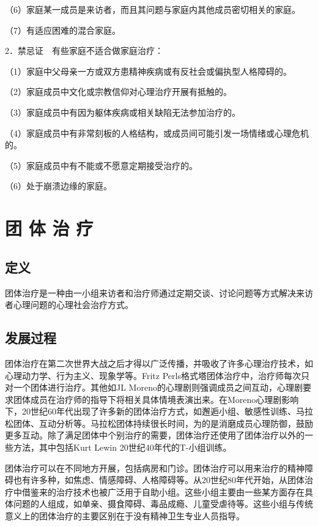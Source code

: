 （6）家庭某一成员是来访者，而且其问题与家庭内其他成员密切相关的家庭。

（7）有适应困难的混合家庭。

2．禁忌证　有些家庭不适合做家庭治疗：

（1）家庭中父母亲一方或双方患精神疾病或有反社会或偏执型人格障碍的。

（2）家庭成员中文化或宗教信仰对心理治疗开展有抵触的。

（3）家庭成员中有因为躯体疾病或相关缺陷无法参加治疗的。

（4）家庭成员中有非常刻板的人格结构，或成员间可能引发一场情绪或心理危机的。

（5）家庭成员中有不能或不愿意定期接受治疗的。

（6）处于崩溃边缘的家庭。


\section{团 体 治 疗}

\subsection{定义}

团体治疗是一种由一小组来访者和治疗师通过定期交谈、讨论问题等方式解决来访者心理问题的心理社会治疗方式。

\subsection{发展过程}

团体治疗在第二次世界大战之后才得以广泛传播，并吸收了许多心理治疗技术，如心理动力学、行为主义、现象学等。Fritz
Perls格式塔团体治疗中，治疗师每次只对一个团体进行治疗。其他如JL
Moreno的心理剧则强调成员之间互动，心理剧要求团体成员在治疗师的指导下将相关具体情境表演出来。在Moreno心理剧影响下，20世纪60年代出现了许多新的团体治疗方式，如邂逅小组、敏感性训练、马拉松团体、互动分析等。马拉松团体持续很长时间，为的是消磨成员心理防御，鼓励更多互动。除了满足团体中个别治疗的需要，团体治疗还使用了团体治疗以外的一些方法，其中包括Kurt
Lewin 20世纪40年代的T-小组训练。

团体治疗可以在不同地方开展，包括病房和门诊。团体治疗可以用来治疗的精神障碍也有许多种，如焦虑、情感障碍、人格障碍等。从20世纪80年代开始，从团体治疗中借鉴来的治疗技术也被广泛用于自助小组。这些小组主要由一些某方面存在具体问题的人组成，如单亲、摄食障碍、毒品成瘾、儿童受虐待等。这些小组与传统意义上的团体治疗的主要区别在于没有精神卫生专业人员指导。

